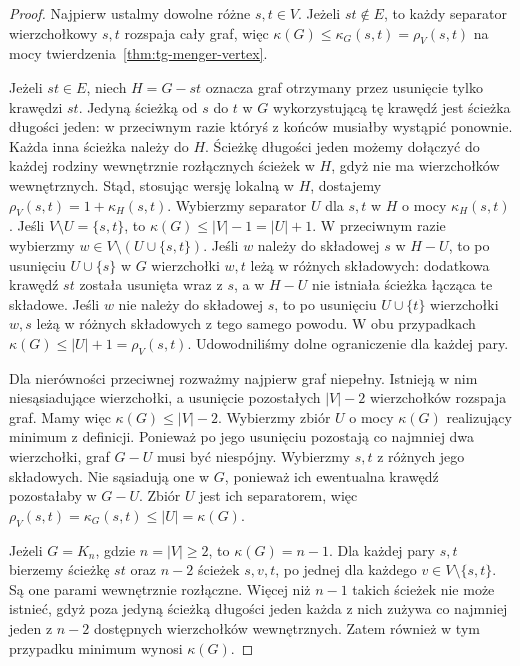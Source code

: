 \begin{proof}
Najpierw ustalmy dowolne różne $s,t\in V$.
Jeżeli $st\notin E$, to każdy separator wierzchołkowy
$s,t$ rozspaja cały graf, więc
$\kappa(G)\le\kappa_G(s,t)=\rho_V(s,t)$
na mocy twierdzenia~\ref{thm:tg-menger-vertex}.

Jeżeli $st\in E$, niech $H=G-st$ oznacza graf otrzymany
przez usunięcie tylko krawędzi $st$. Jedyną ścieżką
od $s$ do $t$ w $G$ wykorzystującą tę krawędź jest
ścieżka długości jeden: w przeciwnym razie któryś
z końców musiałby wystąpić ponownie. Każda inna
ścieżka należy do $H$. Ścieżkę długości jeden
możemy dołączyć do każdej rodziny wewnętrznie rozłącznych
ścieżek w $H$, gdyż nie ma wierzchołków wewnętrznych.
Stąd, stosując wersję lokalną w $H$, dostajemy
$\rho_V(s,t)=1+\kappa_H(s,t)$.
Wybierzmy separator $U$ dla $s,t$ w $H$
o mocy $\kappa_H(s,t)$. Jeśli $V\setminus U=\{s,t\}$,
to $\kappa(G)\le |V|-1=|U|+1$.
W przeciwnym razie wybierzmy
$w\in V\setminus(U\cup\{s,t\})$.
Jeśli $w$ należy do składowej $s$ w $H-U$, to
po usunięciu $U\cup\{s\}$ w $G$ wierzchołki $w,t$
leżą w różnych składowych: dodatkowa krawędź $st$
została usunięta wraz z $s$, a w $H-U$ nie istniała
ścieżka łącząca te składowe.
Jeśli $w$ nie należy do składowej $s$, to
po usunięciu $U\cup\{t\}$ wierzchołki $w,s$
leżą w różnych składowych z tego samego powodu.
W obu przypadkach $\kappa(G)\le |U|+1=\rho_V(s,t)$.
Udowodniliśmy dolne ograniczenie dla każdej pary.

Dla nierówności przeciwnej rozważmy najpierw graf
niepełny. Istnieją w nim niesąsiadujące wierzchołki,
a usunięcie pozostałych $|V|-2$ wierzchołków rozspaja
graf. Mamy więc $\kappa(G)\le |V|-2$.
Wybierzmy zbiór $U$ o mocy $\kappa(G)$ realizujący
minimum z definicji. Ponieważ po jego usunięciu
pozostają co najmniej dwa wierzchołki, graf $G-U$
musi być niespójny. Wybierzmy $s,t$ z różnych jego
składowych. Nie sąsiadują one w $G$, ponieważ ich
ewentualna krawędź pozostałaby w $G-U$.
Zbiór $U$ jest ich separatorem, więc
$\rho_V(s,t)=\kappa_G(s,t)\le |U|=\kappa(G)$.

Jeżeli $G=K_n$, gdzie $n=|V|\ge2$, to
$\kappa(G)=n-1$. Dla każdej pary $s,t$ bierzemy
ścieżkę $st$ oraz $n-2$ ścieżek $s,v,t$,
po jednej dla każdego $v\in V\setminus\{s,t\}$.
Są one parami wewnętrznie rozłączne. Więcej niż
$n-1$ takich ścieżek nie może istnieć, gdyż
poza jedyną ścieżką długości jeden każda z nich
zużywa co najmniej jeden z $n-2$ dostępnych
wierzchołków wewnętrznych. Zatem również w tym
przypadku minimum wynosi $\kappa(G)$.
\end{proof}

